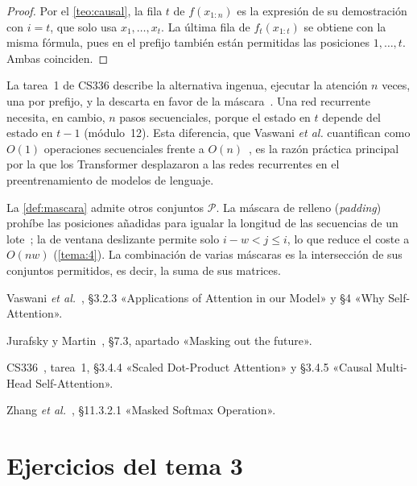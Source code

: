 \begin{proof}
Por el \cref{teo:causal}, la fila $t$ de $f(x_{1:n})$ es la expresión de su demostración con $i=t$, que solo usa $x_1,\dots,x_t$. La última fila de $f_t(x_{1:t})$ se obtiene con la misma fórmula, pues en el prefijo también están permitidas las posiciones $1,\dots,t$. Ambas coinciden.
\end{proof}

La tarea~1 de CS336 describe la alternativa ingenua, ejecutar la atención $n$ veces, una por prefijo, y la descarta en favor de la máscara~\cite[§3.4.5]{cs336}. Una red recurrente necesita, en cambio, $n$ pasos secuenciales, porque el estado en $t$ depende del estado en $t-1$ (módulo~12). Esta diferencia, que Vaswani \emph{et al.} cuantifican como $O(1)$ operaciones secuenciales frente a $O(n)$~\cite[§4, tabla~1]{vaswani}, es la razón práctica principal por la que los Transformer desplazaron a las redes recurrentes en el preentrenamiento de modelos de lenguaje.

\begin{observacion}
La \cref{def:mascara} admite otros conjuntos $\mathcal{P}$. La máscara de relleno (\emph{padding}) prohíbe las posiciones añadidas para igualar la longitud de las secuencias de un lote~\cite[§11.3.2.1]{d2l}; la de ventana deslizante permite solo $i-w<j\le i$, lo que reduce el coste a $O(nw)$ (\cref{tema:4}). La combinación de varias máscaras es la intersección de sus conjuntos permitidos, es decir, la suma de sus matrices.
\end{observacion}

\begin{lecturas}
\item Vaswani \emph{et al.}~\cite{vaswani}, §3.2.3 «Applications of Attention in our Model» y §4 «Why Self-Attention».
\item Jurafsky y Martin~\cite{jm3}, §7.3, apartado «Masking out the future».
\item CS336~\cite{cs336}, tarea~1, §3.4.4 «Scaled Dot-Product Attention» y §3.4.5 «Causal Multi-Head Self-Attention».
\item Zhang \emph{et al.}~\cite{d2l}, §11.3.2.1 «Masked Softmax Operation».
\end{lecturas}

\section*{Ejercicios del tema 3}

